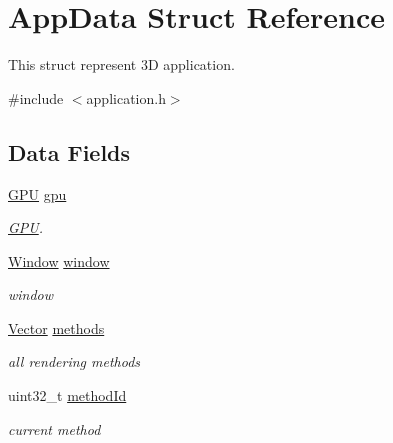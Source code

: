\hypertarget{structAppData}{}\section{App\+Data Struct Reference}
\label{structAppData}


This struct represent 3D application.  




{\ttfamily \#include $<$application.\+h$>$}

\subsection*{Data Fields}
\begin{DoxyCompactItemize}
\item 
\mbox{\label{structAppData_a805cbbcd50daf9b4e202aed90f532f97}} 
\hyperlink{structGPU}{G\+PU} \hyperlink{structAppData_a805cbbcd50daf9b4e202aed90f532f97}{gpu}
\begin{DoxyCompactList}\small\item\em \hyperlink{structGPU}{G\+PU}. \end{DoxyCompactList}\item 
\mbox{\label{structAppData_a6c13a148335a069ffb6751feea3ad398}} 
\hyperlink{structWindow}{Window} \hyperlink{structAppData_a6c13a148335a069ffb6751feea3ad398}{window}
\begin{DoxyCompactList}\small\item\em window \end{DoxyCompactList}\item 
\mbox{\label{structAppData_aff38c888b298fdee1c14d5b97b42b64b}} 
\hyperlink{structVector}{Vector} \hyperlink{structAppData_aff38c888b298fdee1c14d5b97b42b64b}{methods}
\begin{DoxyCompactList}\small\item\em all rendering methods \end{DoxyCompactList}\item 
\mbox{\label{structAppData_af79d9bf119a0591176fce8326a51576b}} 
uint32\+\_\+t \hyperlink{structAppData_af79d9bf119a0591176fce8326a51576b}{method\+Id}
\begin{DoxyCompactList}\small\item\em current method \end{DoxyCompactList}\item 

\end{DoxyCompactItemize}
